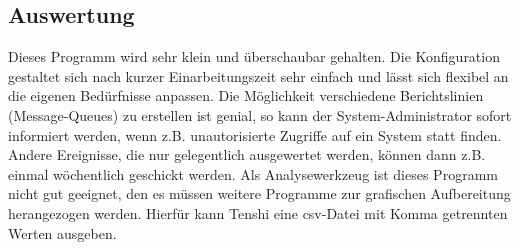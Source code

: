 \subsection{Auswertung}
Dieses Programm wird sehr klein und überschaubar gehalten. Die Konfiguration gestaltet sich nach kurzer Einarbeitungszeit sehr einfach und lässt sich flexibel an die eigenen Bedürfnisse anpassen. Die Möglichkeit verschiedene Berichtslinien (Message-Queues) zu erstellen ist genial, so kann der System-Administrator sofort informiert werden, wenn z.B. unautorisierte Zugriffe auf ein System statt finden. Andere Ereignisse, die nur gelegentlich ausgewertet werden, können dann z.B. einmal wöchentlich geschickt werden. 
Als Analysewerkzeug ist dieses Programm nicht gut geeignet, den es müssen weitere Programme zur grafischen Aufbereitung herangezogen werden. Hierfür kann Tenshi eine csv-Datei mit Komma getrennten Werten ausgeben.
